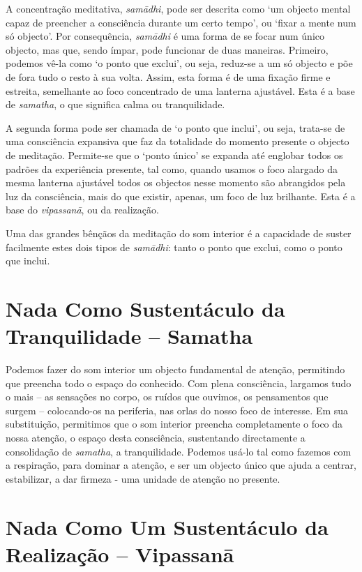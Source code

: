 A concentração meditativa, \emph{samādhi}, pode ser descrita como `um
objecto mental capaz de preencher a consciência durante um certo tempo',
ou `fixar a mente num só objecto'. Por consequência, \emph{samādhi} é
uma forma de se focar num único objecto, mas que, sendo ímpar, pode
funcionar de duas maneiras. Primeiro, podemos vê-la como `o ponto que
exclui', ou seja, reduz-se a um só objecto e põe de fora tudo o resto à
sua volta. Assim, esta forma é de uma fixação firme e estreita,
semelhante ao foco concentrado de uma lanterna ajustável. Esta é a base
de \emph{samatha}, o que significa calma ou tranquilidade.

A segunda forma pode ser chamada de `o ponto que inclui', ou seja,
trata-se de uma consciência expansiva que faz da totalidade do momento
presente o objecto de meditação. Permite-se que o `ponto único' se
expanda até englobar todos os padrões da experiência presente, tal como,
quando usamos o foco alargado da mesma lanterna ajustável todos os
objectos nesse momento são abrangidos pela luz da consciência, mais do
que existir, apenas, um foco de luz brilhante. Esta é a base do
\emph{vipassanā}, ou da realização.

Uma das grandes bênçãos da meditação do som interior é a capacidade de
suster facilmente estes dois tipos de \emph{samādhi}: tanto o ponto que
exclui, como o ponto que inclui.

\section{Nada Como Sustentáculo da Tranquilidade -- Samatha}

Podemos fazer do som interior um objecto fundamental de atenção,
permitindo que preencha todo o espaço do conhecido. Com plena
consciência, largamos tudo o mais -- as sensações no corpo, os ruídos
que ouvimos, os pensamentos que surgem -- colocando-os na periferia, nas
orlas do nosso foco de interesse. Em sua substituição, permitimos que o
som interior preencha completamente o foco da nossa atenção, o espaço
desta consciência, sustentando directamente a consolidação de
\emph{samatha}, a tranquilidade. Podemos usá-lo tal como fazemos com a
respiração, para dominar a atenção, e ser um objecto único que ajuda a
centrar, estabilizar, a dar firmeza - uma unidade de atenção no
presente.

\section{Nada Como Um Sustentáculo da Realização -- Vipassanā}

